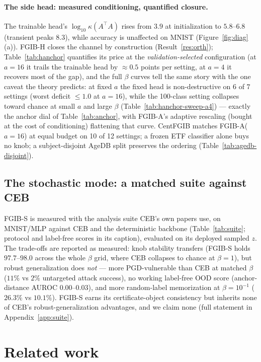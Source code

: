 \documentclass{article} %
\begin{document}
\paragraph{The side head: measured conditioning, quantified closure.}
The trainable head's $\log_{10}\kappa(A^{\top}A)$ rises from $3.9$ at initialization to
$5.8$--$6.8$ (transient peaks $8.3$), while accuracy is unaffected on MNIST
(Figure~\ref{fig:diag}(a)). FGIB-H closes the channel by construction
(Result~\ref{res:orth}); Table~\ref{tab:hanchor} quantifies its price at the
\emph{validation-selected} configuration (at $a=16$ it trails the trainable head by
$\approx 0.5$ points per setting, at $a=4$ it recovers most of the gap), and the full
$\beta$ curves tell the same story with the one caveat the theory predicts: at fixed
$a$ the fixed head is non-destructive on $6$ of $7$ settings (worst deficit $\le 1.0$
at $a{=}16$), while the 100-class setting collapses toward chance at small $a$ and
large $\beta$ (Table~\ref{tab:hanchor-sweep-a4}) --- exactly the anchor dial of
Table~\ref{tab:anchor}, with FGIB-A's adaptive rescaling (bought at the cost of
conditioning) flattening that curve. CentFGIB matches FGIB-A($a{=}16$) at equal budget
on 10 of 12 settings; a frozen ETF classifier alone buys no knob; a subject-disjoint
AgeDB split preserves the ordering (Table~\ref{tab:agedb-disjoint}).

\subsection{The stochastic mode: a matched suite against CEB}
\label{sec:suite}

FGIB-S is measured with the analysis suite CEB's own papers use, on MNIST/MLP against
CEB and the deterministic backbone (Table~\ref{tab:suite}; protocol and label-free
scores in its caption), evaluated on its deployed sampled $z$. The trade-offs are
reported as measured: knob stability transfers (FGIB-S holds $97.7$--$98.0$ across
the whole $\beta$ grid, where CEB collapses to chance at $\beta=1$), but robust
generalization does \emph{not} --- more PGD-vulnerable than CEB at matched $\beta$
($11\%$ vs $2\%$ untargeted attack success), no working label-free OOD score
(anchor-distance AUROC $0.00$--$0.03$), and more random-label memorization at
$\beta{=}10^{-1}$ ($26.3\%$ vs $10.1\%$). FGIB-S earns its certificate-object
consistency but inherits none of CEB's robust-generalization advantages, and we claim
none (full statement in Appendix~\ref{app:suite}).

\section{Related work}
\end{document}
